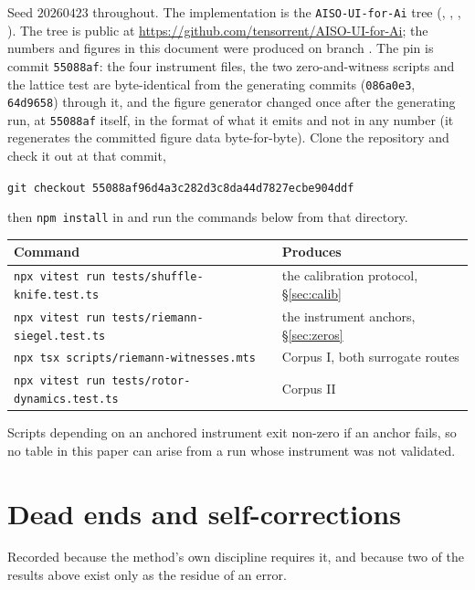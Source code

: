 \documentclass[11pt]{article}
\theoremstyle{remark}
\begin{document}
Seed $20260423$ throughout. The implementation is the \texttt{AISO-UI-for-Ai}
tree (, ,
, ).
The tree is public at \url{https://github.com/tensorrent/AISO-UI-for-Ai}; the numbers and figures in this document were produced on branch . The pin is commit \texttt{55088af}: the four instrument files, the two zero-and-witness scripts and the lattice test are byte-identical from the generating commits (\texttt{086a0e3}, \texttt{64d9658}) through it, and the figure generator changed once after the generating run, at \texttt{55088af} itself, in the format of what it emits and not in any number (it regenerates the committed figure data byte-for-byte). Clone the repository and check it out at that commit,
\begin{center}\small\texttt{git checkout 55088af96d4a3c282d3c8da44d7827ecbe904ddf}\end{center}
then \texttt{npm install} in  and run the commands below from that directory.

\begin{center}\small
\begin{tabular}{ll}
\toprule
Command & Produces \\
\midrule
\texttt{npx vitest run tests/shuffle-knife.test.ts} & the calibration protocol, \S\ref{sec:calib} \\
\texttt{npx vitest run tests/riemann-siegel.test.ts} & the instrument anchors, \S\ref{sec:zeros} \\
\texttt{npx tsx scripts/riemann-witnesses.mts} & Corpus I, both surrogate routes \\
\texttt{npx vitest run tests/rotor-dynamics.test.ts} & Corpus II \\
\bottomrule
\end{tabular}
\end{center}

Scripts depending on an anchored instrument exit non-zero if an anchor fails, so no table
in this paper can arise from a run whose instrument was not validated.

\appendix
\section{Dead ends and self-corrections}

Recorded because the method's own discipline requires it, and because two of the results
above exist only as the residue of an error.
\end{document}
